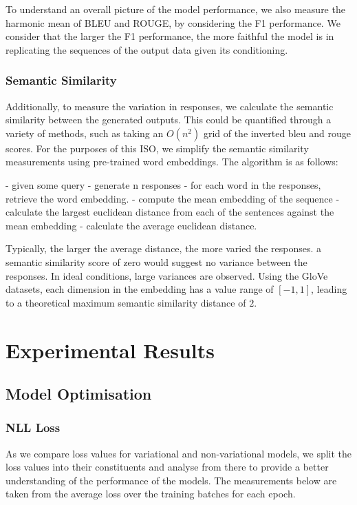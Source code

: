 \documentclass[12pt,twoside]{report}
\begin{document}
To understand an overall picture of the model performance, we also measure the harmonic mean of BLEU and ROUGE, by considering the F1 performance. We consider that the larger the F1 performance, the more faithful the model is in replicating the sequences of the output data given its conditioning.

\subsection{Semantic Similarity}

Additionally, to measure the variation in responses, we calculate the semantic similarity between the generated outputs. This could be quantified through a variety of methods, such as taking an $O(n^2)$ grid of the inverted bleu and rouge scores. For the purposes of this ISO, we simplify the semantic similarity measurements using pre-trained word embeddings. The algorithm is as follows:

- given some query
- generate n responses
- for each word in the responses, retrieve the word embedding.
- compute the mean embedding of the sequence
- calculate the largest euclidean distance from each of the sentences against the mean embedding
- calculate the average euclidean distance.

Typically, the larger the average distance, the more varied the responses. a semantic similarity score of zero would suggest no variance between the responses. In ideal conditions, large variances are observed. Using the GloVe datasets, each dimension in the embedding has a value range of $[-1,1]$, leading to a theoretical maximum semantic similarity distance of $2$.

\chapter{Experimental Results}


\section{Model Optimisation}
\subsection{NLL Loss}

As we compare loss values for variational and non-variational models, we split the loss values into their constituents and analyse from there to provide a better understanding of the performance of the models. The measurements below are taken from the average loss over the training batches for each epoch.
\end{document}
